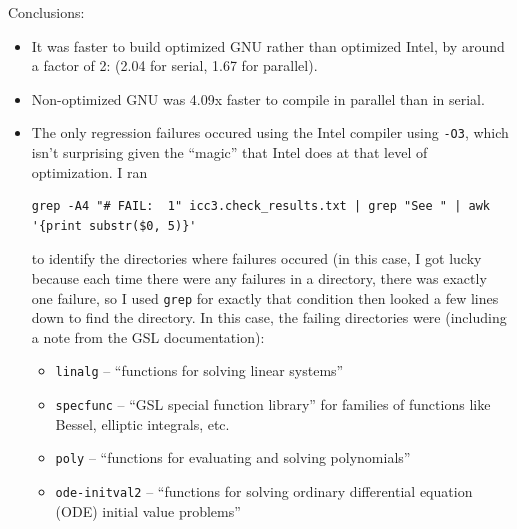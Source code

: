 \documentclass{article}
\begin{document}
Conclusions:
\begin{itemize}
\item It was faster to build optimized GNU rather than optimized Intel, by around a factor of 2: (2.04 for serial, 1.67 for parallel).
\item Non-optimized GNU was 4.09x faster to compile in parallel than in serial.
\item The only regression failures occured using the Intel compiler using \texttt{-O3}, which isn't surprising given
the ``magic'' that Intel does at that level of optimization. 
I ran
\begin{verbatim}
grep -A4 "# FAIL:  1" icc3.check_results.txt | grep "See " | awk '{print substr($0, 5)}'
\end{verbatim}
to identify the directories where failures occured (in this case, I got lucky because each time there were any failures in
a directory, there was exactly one failure, so I used \texttt{grep} for exactly that condition then looked a few lines down to find the directory. In this case, the failing directories were (including a note from the GSL documentation):
\begin{itemize}
\item \texttt{linalg} -- ``functions for solving linear systems''
\item \texttt{specfunc} -- ``GSL special function library'' for families of functions like Bessel, elliptic integrals, etc.
\item \texttt{poly} -- ``functions for evaluating and solving polynomials''
\item \texttt{ode-initval2} -- ``functions for solving ordinary differential equation (ODE) initial value problems''
\end{itemize}
\end{itemize}
\end{document}
